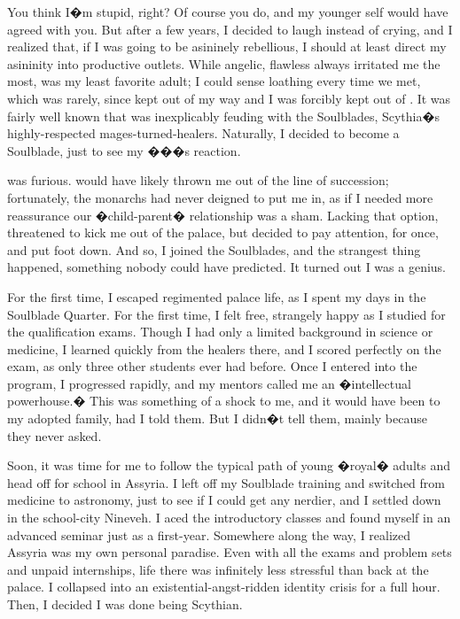 \documentclass[char]{Kos}
\begin{document}
You think I�m stupid, right? Of course you do, and my younger self would have agreed with you. But after a few years, I decided to laugh instead of crying, and I realized that, if I was going to be asininely rebellious, I should at least direct my asininity into productive outlets. While angelic, flawless \cBride{\nickname} always irritated me the most, \cBride{\their} \cQueenTwo{\parent} \cQueenTwo{\nickname} was my least favorite adult; I could sense \cQueenTwo{\their} loathing every time we met, which was rarely, since \cQueenTwo{\they} kept out of my way and I was forcibly kept out of \cQueenTwo{\theirs}. It was fairly well known that \cQueenTwo{\they} was inexplicably feuding with the Soulblades, Scythia�s highly-respected mages-turned-healers. Naturally, I decided to become a Soulblade, just to see my �\cQueenTwo{\parent}��s reaction.

\cQueenTwo{\They} was furious. \cQueenTwo{\They} would have likely thrown me out of the line of succession; fortunately, the monarchs had never deigned to put me in, as if I needed more reassurance our �child-parent� relationship was a sham. Lacking that option, \cQueenTwo{\they} threatened to kick me out of the palace, but \cQueenTwo{\their} \cKingTwo{\spouse} decided to pay attention, for once, and put \cKingTwo{\their} foot down. And so, I joined the Soulblades, and the strangest thing happened, something nobody could have predicted. It turned out I was a genius.

For the first time, I escaped regimented palace life, as I spent my days in the Soulblade Quarter. For the first time, I felt free, strangely happy as I studied for the qualification exams. Though I had only a limited background in science or medicine, I learned quickly from the healers there, and I scored perfectly on the exam, as only three other students ever had before. Once I entered into the program, I progressed rapidly, and my mentors called me an �intellectual powerhouse.� This was something of a shock to me, and it would have been to my adopted family, had I told them. But I didn�t tell them, mainly because they never asked.

Soon, it was time for me to follow the typical path of young �royal� adults and head off for school in Assyria. I left off my Soulblade training and switched from medicine to astronomy, just to see if I could get any nerdier, and I settled down in the school-city Nineveh. I aced the introductory classes and found myself in an advanced seminar just as a first-year. Somewhere along the way, I realized Assyria was my own personal paradise. Even with all the exams and problem sets and unpaid internships, life there was infinitely less stressful than back at the palace. I collapsed into an existential-angst-ridden identity crisis for a full hour. Then, I decided I was done being Scythian.
\end{document}
